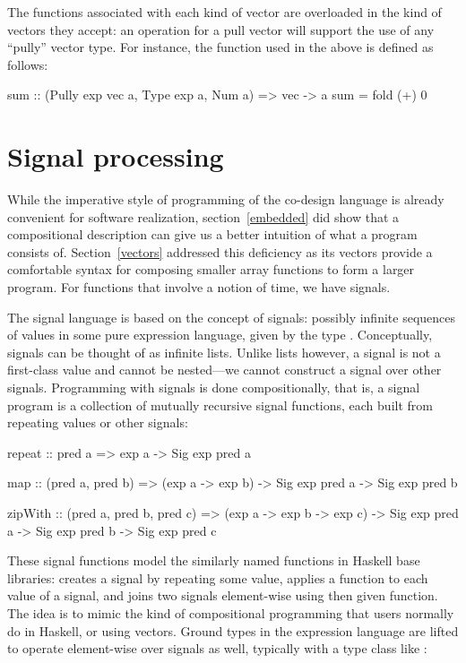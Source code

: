 \documentclass[../paper.tex]{subfiles}
\begin{document}
The functions associated with each kind of vector are overloaded in the kind of vectors they accept: an operation for a pull vector will support the use of any ``pully'' vector type. For instance, the  function used in the above  is defined as follows:

\begin{code}
sum :: (Pully exp vec a, Type exp a, Num a) => vec -> a
sum = fold (+) 0
\end{code}

\section{Signal processing}
\label{signals}

While the imperative style of programming of the co-design language is already convenient for software realization, section~\ref{embedded} did show that a compositional description can give us a better intuition of what a program consists of. Section~\ref{vectors} addressed this deficiency as its vectors provide a comfortable syntax for composing smaller array functions to form a larger program. For functions that involve a notion of time, we have signals.

The signal language is based on the concept of signals: possibly infinite sequences of values in some pure expression language, given by the type . Conceptually, signals can be thought of as infinite lists. Unlike lists however, a signal is not a first-class value and cannot be nested---we cannot construct a signal over other signals. Programming with signals is done compositionally, that is, a signal program is a collection of mutually recursive signal functions, each built from repeating values or other signals:

\begin{code}
repeat :: pred a => exp a -> Sig exp pred a

map :: (pred a, pred b)
  => (exp a -> exp b)
  -> Sig exp pred a -> Sig exp pred b

zipWith :: (pred a, pred b, pred c)
  => (exp a -> exp b -> exp c)
  -> Sig exp pred a -> Sig exp pred b -> Sig exp pred c
\end{code}

These signal functions model the similarly named functions in Haskell base libraries:  creates a signal by repeating some value,  applies a function to each value of a signal, and  joins two signals element-wise using then given function. The idea is to mimic the kind of compositional programming that users normally do in Haskell, or using vectors. Ground types in the expression language are lifted to operate element-wise over signals as well, typically with a type class like :
\end{document}
